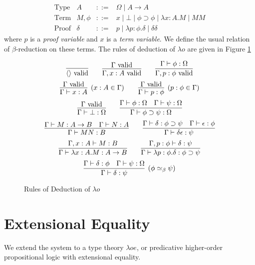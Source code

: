 \[
\begin{array}{lrcl}
\text{Type} & A & ::= & \Omega \mid A \rightarrow A \\
\text{Term} & M, \phi & ::= & x \mid \bot \mid \phi \supset\phi \mid \lambda x:A.M \mid MM \\
\text{Proof} & \delta & ::= & p \mid \lambda p:\phi.\delta \mid \delta \delta
\end{array}
\]
where $p$ is a \emph{proof variable} and $x$ is a \emph{term variable}.  We define the usual relation of $\beta$-reduction on these terms.
The rules of deduction of $\lambda o$ are given in Figure \ref{fig:lambdao}

\begin{figure}
\begin{framed}
\[ \infer{\langle \rangle \vald}{} \qquad
\infer{\Gamma, x : A \vald}{\Gamma \vald} \qquad 
\infer{\Gamma, p : \phi \vald}{\Gamma \vdash \phi : \Omega} \]
\[ \infer[(x : A \in \Gamma)]{\Gamma \vdash x : A}{\Gamma \vald} \qquad
\infer[(p : \phi \in \Gamma)]{\Gamma \vdash p : \phi}{\Gamma \vald} \]
\[ \infer{\Gamma \vdash \bot : \Omega}{\Gamma \vald} \qquad
\infer{\Gamma \vdash \phi \supset \psi : \Omega}{\Gamma \vdash \phi : \Omega \quad \Gamma \vdash \psi : \Omega} \]
\[ \infer{\Gamma \vdash M N : B} {\Gamma \vdash M : A \rightarrow B \quad \Gamma \vdash N : A} \qquad
\infer{\Gamma \vdash \delta \epsilon : \psi} {\Gamma \vdash \delta : \phi \supset \psi \quad \Gamma \vdash \epsilon : \phi} \]
\[ \infer{\Gamma \vdash \lambda x:A.M : A \rightarrow B}{\Gamma, x : A \vdash M : B} \qquad
\infer{\Gamma \vdash \lambda p : \phi . \delta : \phi \supset \psi}{\Gamma, p : \phi \vdash \delta : \psi} \]
\[ \infer[(\phi \simeq_\beta \psi)]{\Gamma \vdash \delta : \psi}{\Gamma \vdash \delta : \phi \quad \Gamma \vdash \psi : \Omega} \]
\end{framed}
\caption{Rules of Deduction of $\lambda o$}
\label{fig:lambdao}
\end{figure}

\section{Extensional Equality}

We extend the system to a type theory $\lambda o e$, or predicative higher-order propositional logic with extensional equality.








